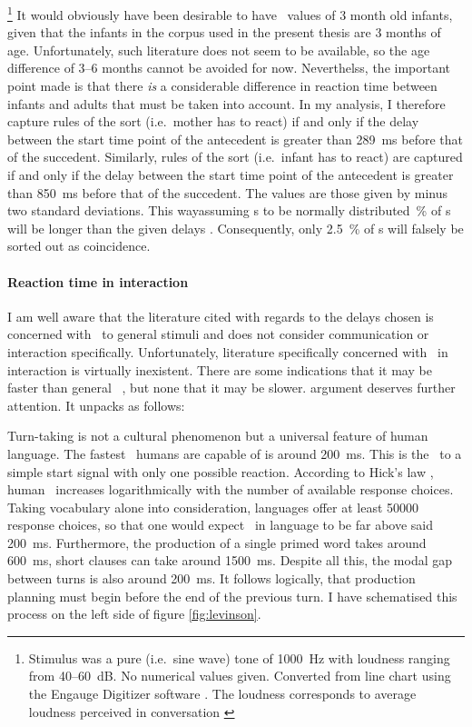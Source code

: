 \footnote{Stimulus was a pure (i.e.~sine wave) tone of 1000~Hz with loudness ranging from 40--60~dB. No numerical values given. Converted from line chart using the Engauge Digitizer software \citep{mitchell02}. The loudness corresponds to average loudness perceived in conversation \citep[]{goerne06}} It would obviously have been desirable to have \rt\ values of 3 month old infants, given that the infants in the  corpus used in the present thesis are 3 months of age. Unfortunately, such literature does not seem to be available, so the age difference of 3--6 months cannot be avoided for now. Neverthelss, the important point made is that there \emph{is} a considerable difference in reaction time between infants and adults that must be taken into account. In my analysis, I therefore capture rules of the sort  (i.e.~mother has to react) if and only if the delay between the start time point of the antecedent is greater than 289~ms before that of the succedent. Similarly, rules of the sort  (i.e.~infant has to react) are captured if and only if the delay between the start time point of the antecedent is greater than 850~ms before that of the succedent. The values are those given by \citet{leibold02} minus two standard deviations. This way\dash assuming \rt s to be normally distributed~\% of \rt s will be longer than the given delays \citep[]{moore16}. Consequently, only 2.5~\% of \rt s will falsely be sorted out as coincidence.

\paragraph{Reaction time in interaction}
I am well aware that the literature cited with regards to the delays chosen is concerned with \rt\ to general stimuli and does not consider communication or interaction specifically. Unfortunately, literature specifically concerned with \rt\ in interaction is virtually inexistent. There are some indications that it may be faster than general \rt\ \citep{levinson16}, but none that it may be slower.  argument deserves further attention. It unpacks as follows:

Turn-taking is not a cultural phenomenon but a universal feature of human language. The fastest \rt\ humans are capable of is around 200~ms. This is the \rt\ to a simple start signal with only one possible reaction. According to Hick's law \citep{hick52}, human \rt\ increases logarithmically with the number of available response choices. Taking vocabulary alone into consideration, languages offer at least 50000 response choices, so that one would expect \rt\ in language to be far above said 200~ms. Furthermore, the production of a single primed word takes around 600~ms, short clauses can take around 1500~ms. Despite all this, the modal gap between turns is also around 200~ms. It follows logically, that production planning must begin before the end of the previous turn. I have schematised this process on the left side of figure \ref{fig:levinson}.


